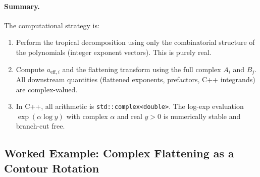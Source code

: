 \documentclass[11pt,a4paper]{article}
\begin{document}
\paragraph{Summary.}
The computational strategy is:
\begin{enumerate}
  \item Perform the tropical decomposition using only the combinatorial
        structure of the polynomials (integer exponent vectors). This is
        purely real.
  \item Compute $a_{\mathrm{eff},i}$ and the flattening transform using the full complex
        $A_i$ and $B_j$. All downstream quantities (flattened exponents,
        prefactors, C++ integrands) are complex-valued.
  \item In C++, all arithmetic is \texttt{std::complex<double>}. The log-exp
        evaluation $\exp(\alpha \log y)$ with complex $\alpha$ and real $y > 0$
        is numerically stable and branch-cut free.
\end{enumerate}

\subsection{Worked Example: Complex Flattening as a Contour Rotation}\label{sec:complex-example}
\end{document}
